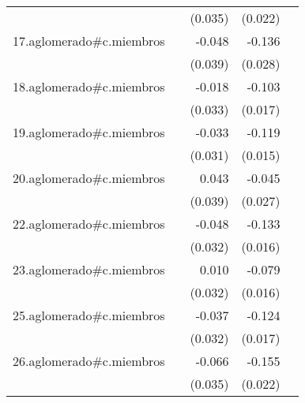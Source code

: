 {\begin{longtable}{l*{4}{D{.}{.}{-1}}}
            &                     &     (0.035)         &     (0.022)         &                     \\
\addlinespace
17.aglomerado#c.miembros&                     &      -0.048         &      -0.136\sym{***}&                     \\
            &                     &     (0.039)         &     (0.028)         &                     \\
\addlinespace
18.aglomerado#c.miembros&                     &      -0.018         &      -0.103\sym{***}&                     \\
            &                     &     (0.033)         &     (0.017)         &                     \\
\addlinespace
19.aglomerado#c.miembros&                     &      -0.033         &      -0.119\sym{***}&                     \\
            &                     &     (0.031)         &     (0.015)         &                     \\
\addlinespace
20.aglomerado#c.miembros&                     &       0.043         &      -0.045         &                     \\
            &                     &     (0.039)         &     (0.027)         &                     \\
\addlinespace
22.aglomerado#c.miembros&                     &      -0.048         &      -0.133\sym{***}&                     \\
            &                     &     (0.032)         &     (0.016)         &                     \\
\addlinespace
23.aglomerado#c.miembros&                     &       0.010         &      -0.079\sym{***}&                     \\
            &                     &     (0.032)         &     (0.016)         &                     \\
\addlinespace
25.aglomerado#c.miembros&                     &      -0.037         &      -0.124\sym{***}&                     \\
            &                     &     (0.032)         &     (0.017)         &                     \\
\addlinespace
26.aglomerado#c.miembros&                     &      -0.066         &      -0.155\sym{***}&                     \\
            &                     &     (0.035)         &     (0.022)         &                     \\

\end{longtable}}
